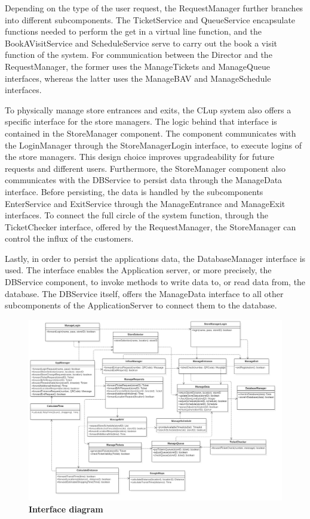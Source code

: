 Depending on the type of the user request, the RequestManager further branches into different subcomponents. The TicketService and QueueService encapsulate functions needed to perform the get in a virtual line function, and the BookAVisitService and ScheduleService serve to carry out the book a visit function of the system. For communication between the Director and the RequestManager, the former uses the ManageTickets and ManageQueue interfaces, whereas the latter uses the ManageBAV and ManageSchedule interfaces. \newline

To physically manage store entrances and exits, the CLup system also offers a specific interface for the store managers. The logic behind that interface is contained in the StoreManager component. The component communicates with the LoginManager through the StoreManagerLogin interface, to execute logins of the store managers. This design choice improves upgradeability for future requests and different users. Furthermore, the StoreManager component also communicates with the DBService to persist data through the ManageData interface. Before persisting, the data is handled by the subcomponents EnterService and ExitService through the ManageEntrance and ManageExit interfaces. To connect the full circle of the system function, through the TicketChecker interface, offered by the RequestManager, the StoreManager can control the influx of the customers. \newline


Lastly, in order to persist the applications data, the DatabaseManager interface is used. The interface enables the Application server, or more precisely, the DBService component, to invoke methods to write data to, or read data from, the database. The DBService itself, offers the ManageData interface to all other subcomponents of the ApplicationServer to connect them to the database. 

\begin{figure}[!h]
\centering
\includegraphics[width=\textwidth]{Images/InterfaceDiagram}
\caption{\label{fig:interfacediagram}\textbf{Interface diagram}}
\end{figure}

